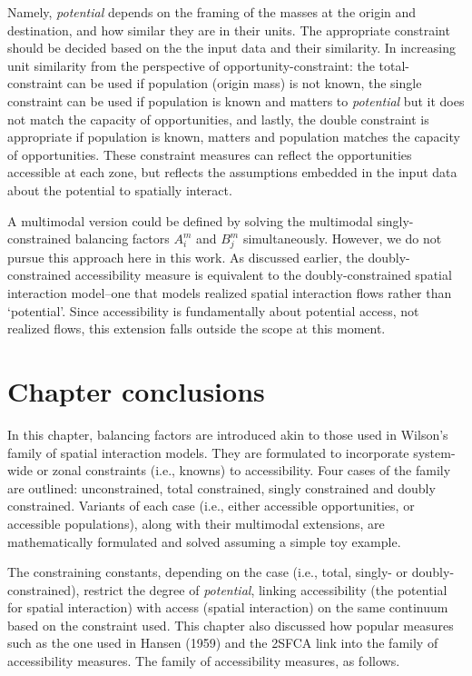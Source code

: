 \documentclass[
11pt, %
oneside, %
english, %
singlespacing, %
]{macthesis} %
\begin{document}
Namely, \emph{potential} depends on the framing of the masses at the origin and destination, and how similar they are in their units. The appropriate constraint should be decided based on the the input data and their similarity. In increasing unit similarity from the perspective of opportunity-constraint: the total-constraint can be used if population (origin mass) is not known, the single constraint can be used if population is known and matters to \emph{potential} but it does not match the capacity of opportunities, and lastly, the double constraint is appropriate if population is known, matters and population matches the capacity of opportunities. These constraint measures can reflect the opportunities accessible at each zone, but reflects the assumptions embedded in the input data about the potential to spatially interact.

A multimodal version could be defined by solving the multimodal singly-constrained balancing factors \(A_i^m\) and \(B_j^m\) simultaneously. However, we do not pursue this approach here in this work. As discussed earlier, the doubly-constrained accessibility measure is equivalent to the doubly-constrained spatial interaction model--one that models realized spatial interaction flows rather than `potential'. Since accessibility is fundamentally about potential access, not realized flows, this extension falls outside the scope at this moment.

\section{Chapter conclusions}\label{chapter-conclusions}

In this chapter, balancing factors are introduced akin to those used in Wilson's family of spatial interaction models. They are formulated to incorporate system-wide or zonal constraints (i.e., knowns) to accessibility. Four cases of the family are outlined: unconstrained, total constrained, singly constrained and doubly constrained. Variants of each case (i.e., either accessible opportunities, or accessible populations), along with their multimodal extensions, are mathematically formulated and solved assuming a simple toy example.

The constraining constants, depending on the case (i.e., total, singly- or doubly- constrained), restrict the degree of \emph{potential}, linking accessibility (the potential for spatial interaction) with access (spatial interaction) on the same continuum based on the constraint used. This chapter also discussed how popular measures such as the one used in Hansen (1959) and the 2SFCA link into the family of accessibility measures. The family of accessibility measures, as follows.
\end{document}
